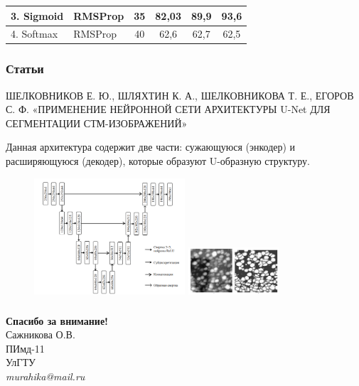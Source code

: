 \documentclass[
	fullscreen=true, 
	bookmarks=false,
	sans serif,
	9pt,
	pdf,
	hyperref={
		pdfpagelabels=false,
		unicode=true
	}
]{beamer}
\begin{document}
\begin{frame}[fragile]
\begin{table}[]
\begin{tabular}{|ll|cccc|}
\multicolumn{1}{|l|}{3. Sigmoid}                                                   & RMSProp                                                                           & \multicolumn{1}{c|}{35}                                                                               & \multicolumn{1}{c|}{82,03}    & \multicolumn{1}{c|}{89,9}      & 93,6   \\ \hline
\multicolumn{1}{|l|}{4. Softmax}                                                   & RMSProp                                                                           & \multicolumn{1}{c|}{40}                                                                               & \multicolumn{1}{c|}{62,6}     & \multicolumn{1}{c|}{62,7}      & 62,5   \\ \hline
\end{tabular}
\end{table}
	\end{frame}
	
	\begin{frame}[fragile]\frametitle{Статьи}	
		ШЕЛКОВНИКОВ Е. Ю., ШЛЯХТИН К. А., ШЕЛКОВНИКОВА Т. Е., ЕГОРОВ С. Ф. «ПРИМЕНЕНИЕ НЕЙРОННОЙ СЕТИ АРХИТЕКТУРЫ U-Net ДЛЯ СЕГМЕНТАЦИИ СТМ-ИЗОБРАЖЕНИЙ»

Данная архитектура содержит две части: сужающуюся (энкодер) и расширяющуюся (декодер), которые образуют U-образную структуру.

\begin{figure}[h]
            \centering
            \includegraphics[width=0.50\textwidth]{img/picture_3.png}
            \includegraphics[width=0.30\textwidth]{img/picture_4.png}
        \end{figure}

	\end{frame}

	\begin{frame}\frametitle{}
		\Large
		\center
		\textbf{Спасибо за внимание!}\\
		\vspace{1.5cm}
		\normalsize
		Сажникова О.В.\\
		ПИмд-11\\
		УлГТУ\\
		\vspace{0.5cm}
		\textit{murahika@mail.ru}
	\end{frame}
	
\end{document}
